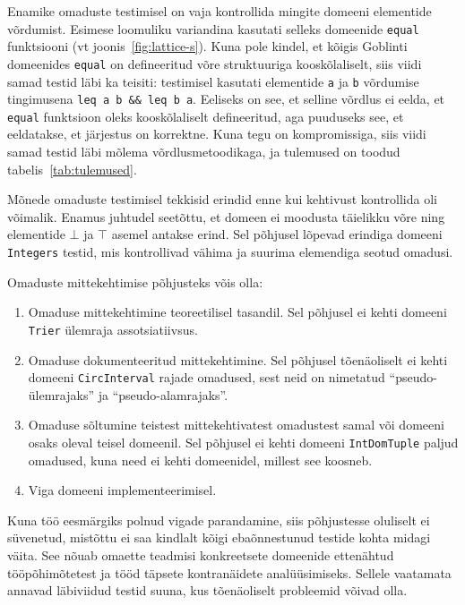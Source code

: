 \documentclass[../thesis.tex]{subfiles}
\begin{document}
Enamike omaduste testimisel on vaja kontrollida mingite domeeni elementide võrdumist. Esimese loomuliku variandina kasutati selleks domeenide \texttt{equal} funktsiooni (vt joonis~\ref{fig:lattice-s}). Kuna pole kindel, et kõigis Goblinti domeenides \texttt{equal} on defineeritud võre struktuuriga kooskõlaliselt, siis viidi samad testid läbi ka teisiti: testimisel kasutati elementide \texttt{a} ja \texttt{b} võrdumise tingimusena \texttt{leq a b \&\& leq b a}. Eeliseks on see, et selline võrdlus ei eelda, et \texttt{equal} funktsioon oleks kooskõlaliselt defineeritud, aga puuduseks see, et eeldatakse, et järjestus on korrektne. Kuna tegu on kompromissiga, siis viidi samad testid läbi mõlema võrdlusmetoodikaga, ja tulemused on toodud tabelis~\ref{tab:tulemused}.

Mõnede omaduste testimisel tekkisid erindid enne kui kehtivust kontrollida oli võimalik. Enamus juhtudel seetõttu, et domeen ei moodusta täielikku võre ning elementide $\bot$ ja $\top$ asemel antakse erind. Sel põhjusel lõpevad erindiga domeeni \texttt{Integers} testid, mis kontrollivad vähima ja suurima elemendiga seotud omadusi.

Omaduste mittekehtimise põhjusteks võis olla:
\begin{enumerate}[nosep]
	\item Omaduse mittekehtimine teoreetilisel tasandil. Sel põhjusel ei kehti domeeni \texttt{Trier} ülemraja assotsiatiivsus.
	\item Omaduse dokumenteeritud mittekehtimine. Sel põhjusel tõenäoliselt ei kehti domeeni \texttt{CircInterval} rajade omadused, sest neid on nimetatud \enquote{pseudo-ülemrajaks} ja \enquote{pseudo-alamrajaks}.
	\item Omaduse sõltumine teistest mittekehtivatest omadustest samal või domeeni osaks oleval teisel domeenil. Sel põhjusel ei kehti domeeni \texttt{IntDomTuple} paljud omadused, kuna need ei kehti domeenidel, millest see koosneb.
	\item Viga domeeni implementeerimisel.
\end{enumerate}
Kuna töö eesmärgiks polnud vigade parandamine, siis põhjustesse oluliselt ei süvenetud, mistõttu ei saa kindlalt kõigi ebaõnnestunud testide kohta midagi väita. See nõuab omaette teadmisi konkreetsete domeenide ettenähtud tööpõhimõtetest ja tööd täpsete kontranäidete analüüsimiseks. Sellele vaatamata annavad läbiviidud testid suuna, kus tõenäoliselt probleemid võivad olla.
\end{document}
